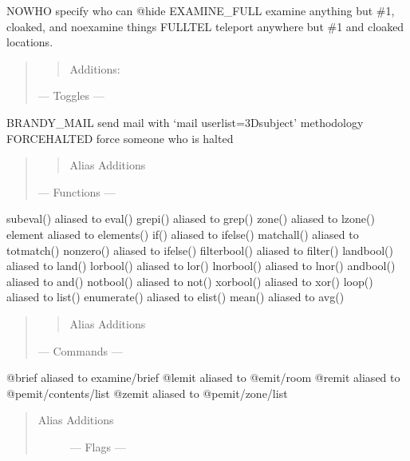 \documentclass[letterpaper,10pt,english]{sphinxmanual}
\begin{document}
\sphinxAtStartPar
NOWHO \sphinxhyphen{} specify who can @hide
EXAMINE\_FULL \sphinxhyphen{} examine anything but \#1, cloaked, and noexamine things
FULLTEL \sphinxhyphen{} teleport anywhere but \#1 and cloaked locations.
\begin{quote}
\begin{quote}

\sphinxAtStartPar
Additions:
\end{quote}

\sphinxAtStartPar
— Toggles —
\end{quote}

\sphinxAtStartPar
BRANDY\_MAIL \sphinxhyphen{} send mail with ‘mail user\sphinxhyphen{}list=3Dsubject’ methodology
FORCEHALTED \sphinxhyphen{} force someone who is halted
\begin{quote}
\begin{quote}

\sphinxAtStartPar
Alias Additions
\end{quote}

\sphinxAtStartPar
— Functions —
\end{quote}

\sphinxAtStartPar
subeval() aliased to eval()
grepi() aliased to grep()
zone() aliased to lzone()
element aliased to elements()
if() aliased to ifelse()
matchall() aliased to totmatch()
nonzero() aliased to ifelse()
filterbool() aliased to filter()
landbool() aliased to land()
lorbool() aliased to lor()
lnorbool() aliased to lnor()
andbool() aliased to and()
notbool() aliased to not()
xorbool() aliased to xor()
loop() aliased to list()
enumerate() aliased to elist()
mean() aliased to avg()
\begin{quote}
\begin{quote}

\sphinxAtStartPar
Alias Additions
\end{quote}

\sphinxAtStartPar
—  Commands —
\end{quote}

\sphinxAtStartPar
@brief aliased to examine/brief
@lemit aliased to @emit/room
@remit aliased to @pemit/contents/list
@zemit aliased to @pemit/zone/list
\begin{quote}
\begin{description}
\item[{Alias Additions}] \leavevmode
\sphinxAtStartPar
— Flags —

\end{description}
\end{quote}
\end{document}
